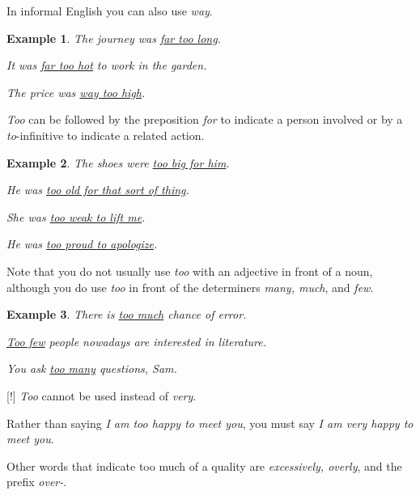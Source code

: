 \documentclass[oneside]{book}
\numberwithin{equation}{section}
\newtheorem{example}{Example}[section]
\begin{document}
In informal English you can also use \textit{way}.
\begin{example}
    The journey was \underline{far too long}.
    
    It was \underline{far too hot} to work in the garden.
    
    The price was \underline{way too high}.
\end{example}
\textit{Too} can be followed by the preposition \textit{for} to indicate a person involved or by a \textit{to}-infinitive to indicate a related action.
\begin{example}
    The shoes were \underline{too big for him}.
    
    He was \underline{too old for that sort of thing}.
    
    She was \underline{too weak to lift me}.
    
    He was \underline{too proud to apologize}.
\end{example}
Note that you do not usually use \textit{too} with an adjective in front of a noun, although you do use \textit{too} in front of the determiners \textit{many, much}, and \textit{few}.
\begin{example}
    There is \underline{too much} chance of error.
    
    \underline{Too few} people nowadays are interested in literature.
    
    You ask \underline{too many} questions, Sam.
\end{example}
%
\noindent{} [!] \textit{Too} cannot be used instead of \textit{very}.

Rather than saying \textit{I am too happy to meet you}, you must say \textit{I am very happy to meet you}.

%
\noindent{} Other words that indicate too much of a quality are \textit{excessively, overly}, and the prefix \textit{over-}.
\end{document}
